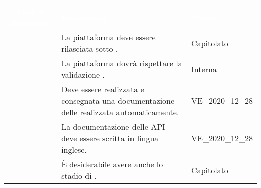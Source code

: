 \renewcommand{\arraystretch}{1.5}


\begin{longtable}{|c C{9.5cm} C{2.5cm}|} 
	
	\textcolor{white}{\textbf{Codice Requisito}}&
	\textcolor{white}{\textbf{Descrizione}}&
	\textcolor{white}{\textbf{Fonte}}\\

	 & La piattaforma deve essere rilasciata sotto . & Capitolato  \\

	 & La piattaforma dovrà rispettare la validazione . & Interna \\
	
	 & Deve essere realizzata e consegnata una documentazione delle  realizzata automaticamente. & VE\_2020\_12\_28 \\
	
	 & La documentazione delle API deve essere scritta in lingua inglese. & VE\_2020\_12\_28 \\
	
	 & È desiderabile avere anche lo stadio di . & Capitolato \\
	
\end{longtable}
